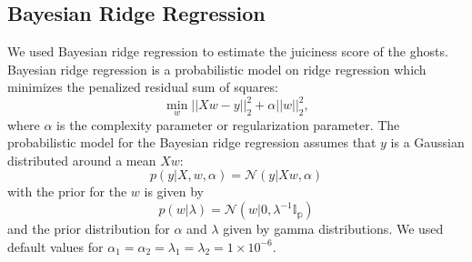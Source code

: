 \documentclass[11pt]{amsart}
\begin{document}

\subsection{Bayesian Ridge Regression}

We used Bayesian ridge regression to estimate the juiciness score of the ghosts. Bayesian ridge regression is a probabilistic model on ridge regression which minimizes the penalized residual sum of squares:
$$ \min_w ||Xw - y||_2^2 + \alpha||w||_2^2,$$
where $\alpha$ is the complexity parameter or regularization parameter. The probabilistic model for the Bayesian ridge regression assumes that $y$ is a Gaussian distributed around a mean $Xw$:
$$ p(y | X, w, \alpha) = \mathcal{N}(y  | Xw, \alpha) $$ 
with the prior for the $w$ is given by
$$ p(w | \lambda) = \mathcal{N}(w | 0, \lambda^{-1}\mathbb{I_p}) $$
and the prior distribution for $\alpha$ and $\lambda$ given by gamma distributions. We used default values for $\alpha_1 = \alpha_2 = \lambda_1 = \lambda_2 = 1 \times 10^{-6}$.
\end{document}

